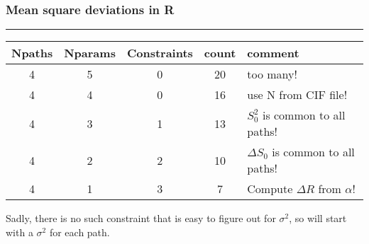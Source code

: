 \documentclass[10pt, xcolor=x11names, compress]{beamer}
\begin{document}
\begin{frame}
  \frametitle{Mean square deviations in R}
  \exafsequation

  \smallskip

  \par\noindent\rule{\textwidth}{0.4pt}
  
  \begin{overlayarea}{\linewidth}{0.5\textheight} 
    \begin{center}
      \begin{tabular}{ccccl}
        Npaths & Nparams & Constraints & count & comment \\
        \hline
        {\color{Gray0}4} & {\color{Gray0}5} & {\color{Gray0}0} & {\color{Gray0}20} & {\color{Gray0}too many!}\\
        {\color{Gray0}4} & {\color{Gray0}4} & {\color{Gray0}0} & {\color{Gray0}16} & {\color{Gray0}use N from CIF file!}\\
        {\color{Gray0}4} & {\color{Gray0}3} & {\color{Gray0}1} & {\color{Gray0}13} & {\color{Gray0}$S_0^2$ is common to all paths!}\\
        {\color{Gray0}4} & {\color{Gray0}2} & {\color{Gray0}2} & {\color{Gray0}10} & {\color{Gray0}$\Delta S_0$ is common to all paths!}\\
        4 & \alert{1} & \alert{3} & \alert{7} & \alert{Compute $\Delta R$ from $\alpha$!}\\
        \hline
      \end{tabular}
    \end{center}

    Sadly, there is no such constraint that is easy to figure out for
    $\sigma^2$, so will start with a $\sigma^2$ for each path.
    
  \end{overlayarea}
\end{frame}
\end{document}
